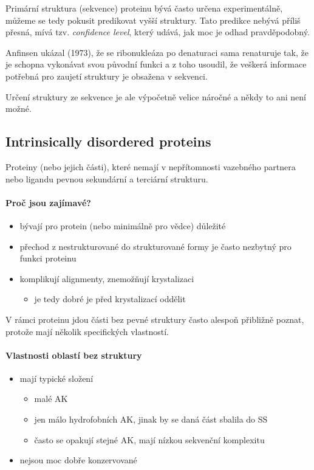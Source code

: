 \documentclass[DIV=8]{scrreprt}
\begin{document}
Primární struktura (sekvence) proteinu bývá často určena experimentálně, můžeme se tedy pokusit predikovat vyšší struktury. Tato predikce nebývá příliš přesná, mívá tzv. \emph{confidence level}, který udává, jak moc je odhad pravděpodobný.

Anfinsen ukázal (1973), že se ribonukleáza po denaturaci sama renaturuje tak, že je schopna vykonávat svou původní funkci a z toho usoudil, že veškerá informace potřebná pro zaujetí struktury je obsažena v sekvenci.

Určení struktury ze sekvence je ale výpočetně velice náročné a někdy to ani není možné.

\subsection{Intrinsically disordered proteins} \label{Intrinsically disordered proteins}


Proteiny (nebo jejich části), které nemají v nepřítomnosti vazebného partnera nebo ligandu pevnou sekundární a terciární strukturu.

\paragraph{Proč jsou zajímavé?}
\begin{itemize}[nosep]
    \item bývají pro protein (nebo minimálně pro vědce) důležité
    \item přechod z nestrukturované do strukturované formy je často nezbytný pro funkci proteinu
    \item komplikují alignmenty, znemožňují krystalizaci
\begin{itemize}[nosep]
    \item je tedy dobré je před krystalizací oddělit
\end{itemize}

\end{itemize}



V rámci proteinu jdou části bez pevné struktury často alespoň přibližně poznat, protože mají několik specifických vlastností.

\paragraph{Vlastnosti oblastí bez struktury}
\begin{itemize}[nosep]
    \item mají typické složení
\begin{itemize}[nosep]
    \item malé AK
    \item jen málo hydrofobních AK, jinak by se daná část sbalila do SS
    \item často se opakují stejné AK, mají nízkou sekvenční komplexitu
\end{itemize}

    \item nejsou moc dobře konzervované
\end{itemize}
\end{document}

